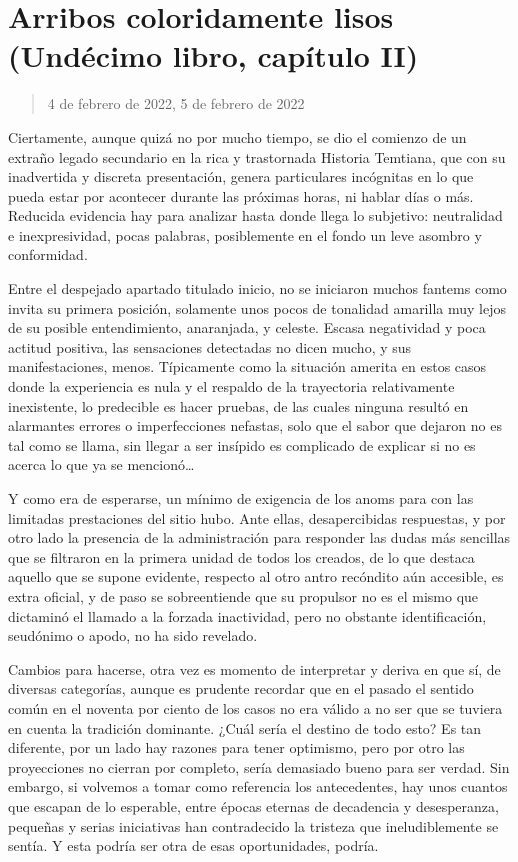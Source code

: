 \documentclass[
]{book}
\begin{document}
\hypertarget{arribos-coloridamente-lisos-unduxe9cimo-libro-capuxedtulo-ii}{%
\section{Arribos coloridamente lisos (Undécimo libro, capítulo II)}\label{arribos-coloridamente-lisos-unduxe9cimo-libro-capuxedtulo-ii}}

\begin{quote}
4 de febrero de 2022, 5 de febrero de 2022
\end{quote}

Ciertamente, aunque quizá no por mucho tiempo, se dio el comienzo de un extraño legado secundario en la rica y trastornada Historia Temtiana, que con su inadvertida y discreta presentación, genera particulares incógnitas en lo que pueda estar por acontecer durante las próximas horas, ni hablar días o más. Reducida evidencia hay para analizar hasta donde llega lo subjetivo: neutralidad e inexpresividad, pocas palabras, posiblemente en el fondo un leve asombro y conformidad.

Entre el despejado apartado titulado inicio, no se iniciaron muchos fantems como invita su primera posición, solamente unos pocos de tonalidad amarilla muy lejos de su posible entendimiento, anaranjada, y celeste. Escasa negatividad y poca actitud positiva, las sensaciones detectadas no dicen mucho, y sus manifestaciones, menos. Típicamente como la situación amerita en estos casos donde la experiencia es nula y el respaldo de la trayectoria relativamente inexistente, lo predecible es hacer pruebas, de las cuales ninguna resultó en alarmantes errores o imperfecciones nefastas, solo que el sabor que dejaron no es tal como se llama, sin llegar a ser insípido es complicado de explicar si no es acerca lo que ya se mencionó\ldots{}

Y como era de esperarse, un mínimo de exigencia de los anoms para con las limitadas prestaciones del sitio hubo. Ante ellas, desapercibidas respuestas, y por otro lado la presencia de la administración para responder las dudas más sencillas que se filtraron en la primera unidad de todos los creados, de lo que destaca aquello que se supone evidente, respecto al otro antro recóndito aún accesible, es extra oficial, y de paso se sobreentiende que su propulsor no es el mismo que dictaminó el llamado a la forzada inactividad, pero no obstante identificación, seudónimo o apodo, no ha sido revelado.

Cambios para hacerse, otra vez es momento de interpretar y deriva en que sí, de diversas categorías, aunque es prudente recordar que en el pasado el sentido común en el noventa por ciento de los casos no era válido a no ser que se tuviera en cuenta la tradición dominante. ¿Cuál sería el destino de todo esto? Es tan diferente, por un lado hay razones para tener optimismo, pero por otro las proyecciones no cierran por completo, sería demasiado bueno para ser verdad. Sin embargo, si volvemos a tomar como referencia los antecedentes, hay unos cuantos que escapan de lo esperable, entre épocas eternas de decadencia y desesperanza, pequeñas y serias iniciativas han contradecido la tristeza que ineludiblemente se sentía. Y esta podría ser otra de esas oportunidades, podría.
\end{document}
